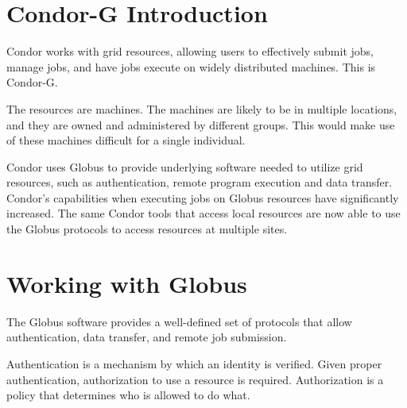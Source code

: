 \section{\label{sec:Condor-G-Intro}Condor-G Introduction}

Condor works with grid resources, allowing users to
effectively submit jobs, manage jobs, and have jobs execute
on widely distributed machines.
This is Condor-G.

The resources are machines.
The machines are likely to be in multiple locations, and
they are owned and administered by different groups. 
This would make use of these machines difficult for a
single individual.

Condor uses 
Globus to provide underlying software needed to utilize
grid resources, such as authentication, remote program
execution and data transfer.
Condor's capabilities when executing jobs on Globus resources have
significantly increased.
The same Condor tools that access local resources 
are now able to use the Globus protocols to access resources at multiple
sites. 

\section{\label{sec:Globus-intro}Working with Globus}

The Globus software provides a well-defined set of protocols
that allow authentication, data transfer, and remote job submission.

Authentication is a mechanism by which an identity is verified.
Given proper authentication, authorization to use a resource
is required.
Authorization is a policy that determines who is allowed to do what. 


